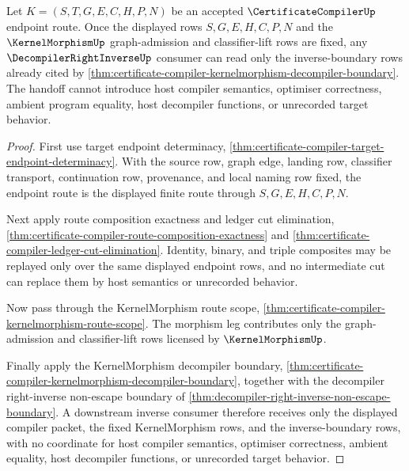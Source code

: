 \begin{theorem}
\label{thm:certificate-compiler-endpoint-decompiler-handoff-determinacy}
Let $K=(S,T,G,E,C,H,P,N)$ be an accepted $\CertificateCompilerUp$ endpoint route. Once the displayed rows $S,G,E,H,C,P,N$ and the $\KernelMorphismUp$ graph-admission and classifier-lift rows are fixed, any $\DecompilerRightInverseUp$ consumer can read only the inverse-boundary rows already cited by \autoref{thm:certificate-compiler-kernelmorphism-decompiler-boundary}. The handoff cannot introduce host compiler semantics, optimiser correctness, ambient program equality, host decompiler functions, or unrecorded target behavior.
\end{theorem}
\begin{proof}
First use target endpoint determinacy, \autoref{thm:certificate-compiler-target-endpoint-determinacy}. With the source row, graph edge, landing row, classifier transport, continuation row, provenance, and local naming row fixed, the endpoint route is the displayed finite route through $S,G,E,H,C,P,N$.

Next apply route composition exactness and ledger cut elimination, \autoref{thm:certificate-compiler-route-composition-exactness} and \autoref{thm:certificate-compiler-ledger-cut-elimination}. Identity, binary, and triple composites may be replayed only over the same displayed endpoint rows, and no intermediate cut can replace them by host semantics or unrecorded behavior.

Now pass through the KernelMorphism route scope, \autoref{thm:certificate-compiler-kernelmorphism-route-scope}. The morphism leg contributes only the graph-admission and classifier-lift rows licensed by $\KernelMorphismUp$.

Finally apply the KernelMorphism decompiler boundary, \autoref{thm:certificate-compiler-kernelmorphism-decompiler-boundary}, together with the decompiler right-inverse non-escape boundary of \autoref{thm:decompiler-right-inverse-non-escape-boundary}. A downstream inverse consumer therefore receives only the displayed compiler packet, the fixed KernelMorphism rows, and the inverse-boundary rows, with no coordinate for host compiler semantics, optimiser correctness, ambient equality, host decompiler functions, or unrecorded target behavior.
\end{proof}

